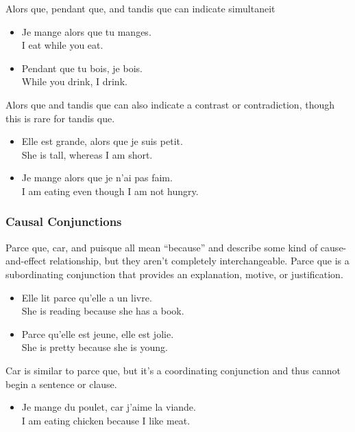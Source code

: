 Alors que, pendant que, and tandis que can indicate simultaneit

\begin{itemize}
  \item  Je mange alors que tu manges. \\ I eat while you eat.
  \item  Pendant que tu bois, je bois. \\ While you drink, I drink.
\end{itemize}

Alors que and tandis que can also indicate a contrast or contradiction, though this is rare for tandis que.

\begin{itemize}
  \item  Elle est grande, alors que je suis petit. \\ She is tall, whereas I am short.
  \item  Je mange alors que je n'ai pas faim. \\ I am eating even though I am not hungry.
\end{itemize}

\subsubsection{Causal Conjunctions}

Parce que, car, and puisque all mean ``because'' and describe some kind of cause-and-effect relationship, but they aren't completely interchangeable.  Parce que is a subordinating conjunction that provides an explanation, motive, or justification.

\begin{itemize}
  \item  Elle lit parce qu'elle a un livre. \\ She is reading because she has a book.
  \item  Parce qu'elle est jeune, elle est jolie. \\ She is pretty because she is young.
\end{itemize}

Car is similar to parce que, but it's a coordinating conjunction and thus cannot begin a sentence or clause.

\begin{itemize}
  \item  Je mange du poulet, car j'aime la viande. \\ I am eating chicken because I like meat.
\end{itemize}

